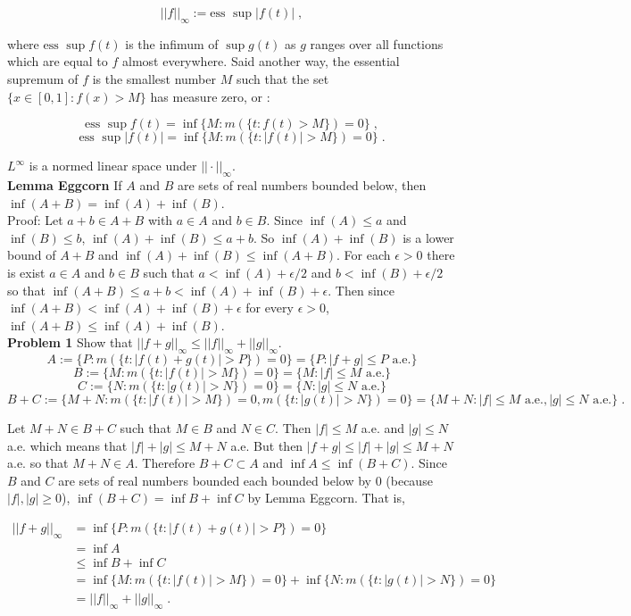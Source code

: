 \documentclass[a4paper]{article}
\begin{document}
$$||f||_\infty := \text{ess } \sup |f(t)| \; ,$$

where $\text{ess } \sup f(t)$ is the infimum of $\sup g(t)$ as $g$ ranges over all functions which are equal to $f$ almost everywhere. Said another way, the essential supremum of $f$ is the smallest number $M$ such that the set $\{x \in [0,1] : f(x) > M \}$ has measure zero, or :

$$\text{ess } \sup f(t) = \inf \{M : m(\{t : f(t) > M\}) = 0 \} \;,$$
$$\text{ess } \sup |f(t)| = \inf \{M : m(\{t : |f(t)| > M\}) = 0 \} \;.$$

$L^\infty$ is a normed linear space under $||\cdot ||_\infty$. \\

{\bf Lemma Eggcorn} If $A$ and $B$ are sets of real numbers bounded below, then $\inf(A+B)= \inf(A) + \inf(B)$. \\

Proof: Let $a+b \in A+B$ with $a \in A$ and $b \in B$. Since $\inf(A) \leq a$ and $\inf(B) \leq b$, $\inf(A) + \inf(B) \leq a+b$. So $\inf(A) + \inf(B)$ is a lower bound of $A+B$ and $\inf(A) + \inf(B) \leq \inf(A+B)$. For each $\epsilon > 0$ there is exist $a \in A$ and $b \in B$ such that $a< \inf(A) + \epsilon / 2$ and $b < \inf(B) + \epsilon /2$ so that $\inf(A+B) \leq a+b < \inf(A) + \inf(B) + \epsilon$. Then since $\inf(A+B) < \inf(A) +\inf(B) + \epsilon$ for every $\epsilon > 0$, $\inf(A+B) \leq \inf(A) + \inf(B)$. \\

{\bf Problem 1} Show that $||f+g||_\infty \leq ||f||_\infty + ||g||_\infty$.\\


$$A := \{P : m(\{t: |f(t) + g(t)| > P\}) = 0\} = \{P : |f+g| \leq P \text{ a.e.} \}$$
$$B := \{M : m(\{t: |f(t)| > M\}) = 0\} = \{M : |f| \leq M \text{ a.e.} \}$$
$$C := \{N : m(\{t: |g(t)| > N\}) = 0\} = \{N : |g| \leq N \text{ a.e.} \}$$
$$B+C := \{M+N : m(\{t: |f(t)| > M\}) = 0, m(\{t: |g(t)| > N\}) = 0\} = \{M+N : |f| \leq M \text{ a.e.}, |g| \leq N \text{ a.e.} \}\;.$$

Let $M+N \in B+C$ such that $M \in B$ and $N \in C$. Then $|f| \leq M$ a.e. and $|g| \leq N$ a.e. which means that $|f| + |g| \leq M+N$ a.e. But then $|f+g| \leq |f| + |g| \leq M+N$ a.e. so that $M+N \in A$. Therefore $B+C \subset A$ and $\inf A \leq \inf (B+C)$. Since $B$ and $C$ are sets of real numbers bounded each bounded below by 0 (because $|f|, |g| \geq 0$), $\inf (B+C) = \inf B + \inf C$ by Lemma Eggcorn. That is,

\begin{align*}
||f + g||_\infty &= \inf \{P : m(\{t: |f(t) + g(t)| > P\}) = 0\} \\
&= \inf A\\
& \leq \inf B + \inf C\\
& = \inf \{M : m(\{t: |f(t)| > M\}) = 0\} + \inf \{N : m(\{t: |g(t)| > N\}) = 0\}\\
& = ||f||_\infty + ||g||_\infty \;.
\end{align*}
\end{document}
